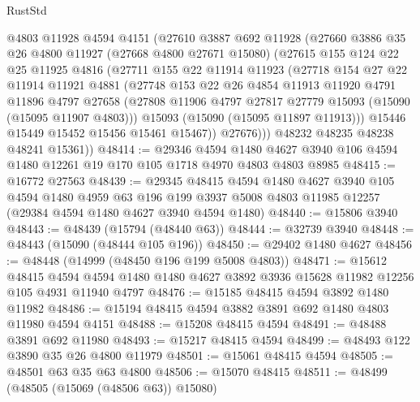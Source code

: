 \begin{lexlean}{RustStd}
\begin{coremodule}
        @4803
        @11928
        @4594
        @4151
        (@27610
          @3887
          @692
          @11928
          (@27660
            @3886
            @35
            @26
            @4800
            @11927
            (@27668 @4800 @27671 @15080)
            (@27615
              @155
              @124
              @22
              @25
              @11925
              @4816
              (@27711
                @155
                @22
                @11914
                @11923
                (@27718
                  @154
                  @27
                  @22
                  @11914
                  @11921
                  @4881
                  (@27748
                    @153
                    @22
                    @26
                    @4854
                    @11913
                    @11920
                    @4791
                    @11896
                    @4797
                    @27658
                    (@27808 @11906 @4797 @27817 @27779 @15093 (@15090 (@15095 @11907 @4803)))
                    @15093
                    (@15090 (@15095 @11897 @11913)))
                  @15446
                  @15449
                  @15452
                  @15456
                  @15461
                  @15467))
              @27676)))
        @48232
        @48235
        @48238
        @48241
        @15361))
@48414 := @29346
    @4594
    @1480
    @4627
    @3940
    @106
    @4594
    @1480
    @12261
    @19
    @170
    @105
    @1718
    @4970
    @4803
    @4803
    @8985
@48415 := @16772 @27563
@48439 := @29345
    @48415
    @4594
    @1480
    @4627
    @3940
    @105
    @4594
    @1480
    @4959
    @63
    @196
    @199
    @3937
    @5008
    @4803
    @11985
    @12257
    (@29384 @4594 @1480 @4627 @3940 @4594 @1480)
@48440 := @15806 @3940
@48443 := @48439 (@15794 (@48440 @63))
@48444 := @32739 @3940
@48448 := @48443 (@15090 (@48444 @105 @196))
@48450 := @29402 @1480 @4627
@48456 := @48448 (@14999 (@48450 @196 @199 @5008 @4803))
@48471 := @15612
    @48415
    @4594
    @4594
    @1480
    @1480
    @4627
    @3892
    @3936
    @15628
    @11982
    @12256
    @105
    @4931
    @11940
    @4797
@48476 := @15185 @48415 @4594 @3892 @1480 @11982
@48486 := @15194 @48415 @4594 @3882 @3891 @692 @1480 @4803 @11980 @4594 @4151
@48488 := @15208 @48415 @4594
@48491 := @48488 @3891 @692 @11980
@48493 := @15217 @48415 @4594
@48499 := @48493 @122 @3890 @35 @26 @4800 @11979
@48501 := @15061 @48415 @4594
@48505 := @48501 @63 @35 @63 @4800
@48506 := @15070 @48415
@48511 := @48499 (@48505 (@15069 (@48506 @63)) @15080)

\end{coremodule}
\end{lexlean}
